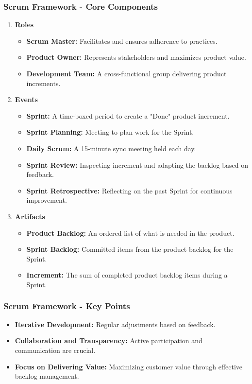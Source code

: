 \documentclass{beamer}
\begin{document}
\begin{frame}[fragile]
    \frametitle{Scrum Framework - Core Components}
    \begin{enumerate}
        \item \textbf{Roles}
        \begin{itemize}
            \item \textbf{Scrum Master:} Facilitates and ensures adherence to practices.
            \item \textbf{Product Owner:} Represents stakeholders and maximizes product value.
            \item \textbf{Development Team:} A cross-functional group delivering product increments.
        \end{itemize}
        
        \item \textbf{Events}
        \begin{itemize}
            \item \textbf{Sprint:} A time-boxed period to create a "Done" product increment.
            \item \textbf{Sprint Planning:} Meeting to plan work for the Sprint.
            \item \textbf{Daily Scrum:} A 15-minute sync meeting held each day.
            \item \textbf{Sprint Review:} Inspecting increment and adapting the backlog based on feedback.
            \item \textbf{Sprint Retrospective:} Reflecting on the past Sprint for continuous improvement.
        \end{itemize}

        \item \textbf{Artifacts}
        \begin{itemize}
            \item \textbf{Product Backlog:} An ordered list of what is needed in the product.
            \item \textbf{Sprint Backlog:} Committed items from the product backlog for the Sprint.
            \item \textbf{Increment:} The sum of completed product backlog items during a Sprint.
        \end{itemize}
    \end{enumerate}
\end{frame}

\begin{frame}[fragile]
    \frametitle{Scrum Framework - Key Points}
    \begin{itemize}
        \item \textbf{Iterative Development:} Regular adjustments based on feedback.
        \item \textbf{Collaboration and Transparency:} Active participation and communication are crucial.
        \item \textbf{Focus on Delivering Value:} Maximizing customer value through effective backlog management.
    \end{itemize}
\end{frame}
\end{document}
